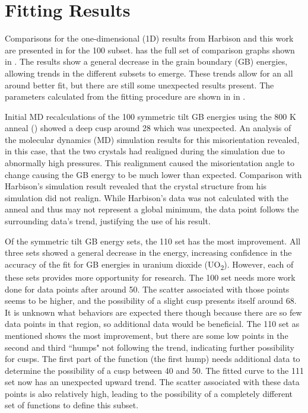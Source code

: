 \documentclass[12pt]{report}
\begin{document}
\section{Fitting Results\label{results:fit}}
Comparisons for the one-dimensional (1D) results from Harbison\cite{harbison2015} and this work are presented in  for the \textlangle{}100\textrangle{} subset.   has the full set of comparison graphs shown in .  The results show a general decrease in the grain boundary (GB) energies, allowing trends in the different subsets to emerge.  These trends allow for an all around better fit, but there are still some unexpected results present.  The parameters calculated from the fitting procedure are shown in  in .

Initial MD recalculations of the \textlangle{}100\textrangle{} symmetric tilt GB energies using the 800 K anneal () showed a deep cusp around 28\textdegree{} which was unexpected.  An analysis of the molecular dynamics (MD) simulation results for this misorientation revealed, in this case, that the two crystals had realigned during the simulation due to abnormally high pressures.  This realignment caused the misorientation angle to change causing the GB energy to be much lower than expected.  Comparison with Harbison's simulation result revealed that the crystal structure from his simulation did not realign.  While Harbison's data was not calculated with the anneal and thus may not represent a global minimum, the data point follows the surrounding data's trend, justifying the use of his result.

Of the symmetric tilt GB energy sets, the \textlangle{}110\textrangle{} set has the most improvement.  All three sets showed a general decrease in the energy, increasing confidence in the accuracy of the fit for GB energies in uranium dioxide (UO\textsubscript{2}).  However, each of these sets provides more opportunity for research.  The \textlangle{}100\textrangle{} set needs more work done for data points after around 50\textdegree{}.  The scatter associated with those points seems to be higher, and the possibility of a slight cusp presents itself around 68\textdegree{}.  It is unknown what behaviors are expected there though because there are so few data points in that region, so additional data would be beneficial.  The \textlangle{}110\textrangle{} set as mentioned shows the most improvement, but there are some low points in the second and third ``humps" not following the trend, indicating further possibility for cusps.  The first part of the function (the first hump) needs additional data to determine the possibility of a cusp between 40\textdegree{} and 50\textdegree{}.  The fitted curve to the \textlangle{}111\textrangle{} set now has an unexpected upward trend.  The scatter associated with these data points is also relatively high, leading to the possibility of a completely different set of functions to define this subset.
\end{document}
